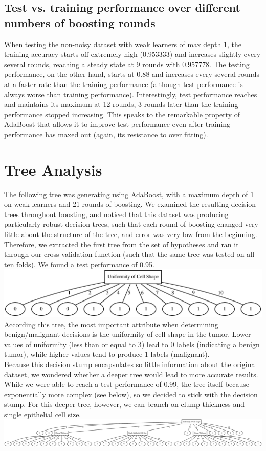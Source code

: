 \documentclass[11pt]{article}
\begin{document}
\subsection{Test vs. training performance over different numbers of boosting rounds}
When testing the non-noisy dataset with weak learners of max depth 1, the training accuracy starts off extremely high (0.953333) and increases slightly every several rounds, reaching a steady state at 9 rounds with 0.957778. The testing performance, on the other hand, starts at 0.88 and increases every several rounds at a faster rate than the training performance (although test performance is always worse than training performance). Interestingly, test performance reaches and maintains its maximum at 12 rounds, 3 rounds later than the training performance stopped increasing. This speaks to the remarkable property of AdaBoost that allows it to improve test performance even after training performance has maxed out (again, its resistance to over fitting).

\section{Tree Analysis}
The following tree was generating using AdaBoost, with a maximum depth of 1 on weak learners and 21 rounds of boosting. We examined the resulting decision trees throughout boosting, and noticed that this dataset was producing particularly robust decision trees, such that each round of boosting changed very little about the structure of the tree, and error was very low from the beginning. Therefore, we extracted the first tree from the set of hypotheses and ran it through our cross validation function (such that the same tree was tested on all ten folds). We found a test performance of 0.95.\\
\includegraphics[scale=0.75]{tree_pt4_alternate}
According this tree, the most important attribute when determining benign/malignant decisions is the uniformity of cell shape in the tumor. Lower values of uniformity (less than or equal to 3) lead to 0 labels (indicating a benign tumor), while higher values tend to produce 1 labels (malignant). \\

Because this decision stump encapsulates so little information about the original dataset, we wondered whether a deeper tree would lead to more accurate results. While we were able to reach a test performance of 0.99, the tree itself because exponentially more complex (see below), so we decided to stick with the decision stump. For this deeper tree, however, we can branch on clump thickness and single epithelial cell size. \\
\includegraphics[scale=0.25]{tree_pt4}
\end{document}
